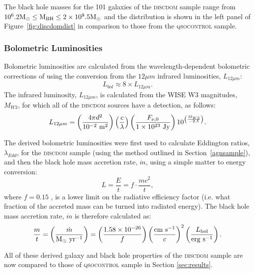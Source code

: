 {The black hole masses for the 101 galaxies of the \textsc{discdom} sample range from {\notebsm $10^6.2 \rm{M}_{\odot} \leq M_{\rm BH} \leq 2 \times 10^9.5 \rm{M}_{\odot}$} and the distribution is shown in the left panel of Figure~\ref{fig:discdomdist} in comparison to those from the \textsc{qsocontrol} sample. 

\subsubsection{Bolometric Luminosities}\label{sec:eddratios}

Bolometric luminosities are calculated from the wavelength-dependent bolometric corrections of \citet{richards06} using the conversion from the $12\mu m$ infrared luminosities, $ L_{12\mu m}$:
\begin{equation}
L_{bol} \approx 8 \times L_{12\mu m}.
\end{equation}
The infrared luminosity,  $L_{12\mu m}$, is calculated from the WISE W3 magnitudes, $M_{W3}$, for which all of the \textsc{discdom} sources have a detection, as follows:
\begin{equation}
L_{12\mu m} = \left(\frac{4\pi d^2}{10^{-2}~\rm{m}^2}\right)\left( \frac{c}{\lambda}\right) \left(\frac{F_{\nu, 0}}{1\times10^{23}~ \rm{Jy}} \right)10^{\left(\frac{M_{W3}}{-2.5}\right)}.
\end{equation}

The derived bolometric luminosities were first used to calculate Eddington ratios, $\lambda_{Edd}$, for the \textsc{discdom} sample (using the method outlined in Section~\ref{agnsample}), and then the black hole mass accretion rate, $\dot{m}$, using a simple matter to energy conversion:
\begin{equation}\label{eq:ltomdot}
L = \frac{E}{t} = f\cdot \frac{mc^2}{t},
\end{equation}
where $f =0.15$ \citep{elvis02}, is a lower limit on the radiative efficiency factor (i.e. what fraction of the accreted mass can be turned into radiated energy). The black hole mass accretion rate, $\dot{m}$ is therefore calculated as:
\begin{equation}\label{eq:mdot}
\frac{m}{t} = \left(\frac{\dot{m}}{\rm{M}_{\odot}~\rm{yr}^{-1}}\right) = \left( \frac{1.58\times 10^{-26}}{f} \right) \left( \frac{\rm{cm}~\rm{s}^{-1}}{c} \right)^2 \left( \frac{L_{\rm{bol}}}{\rm{erg}~\rm{s}^{-1}} \right).
\end{equation}

All of these derived galaxy and black hole properties of the \textsc{discdom} sample are now compared to those of \textsc{qsocontrol} sample in Section \ref{sec:results}.


}
